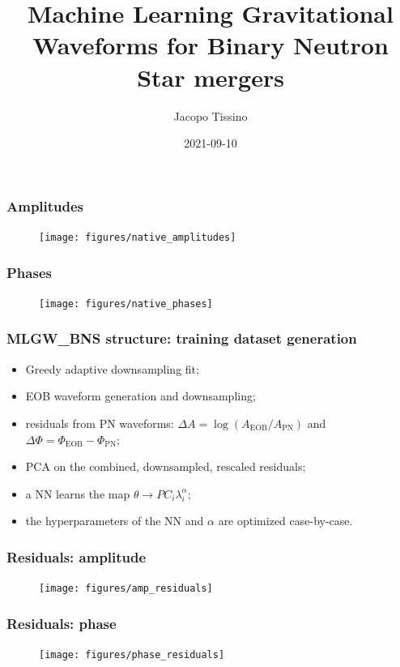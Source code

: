 \documentclass{beamer}
\title{Machine Learning Gravitational Waveforms for Binary Neutron Star mergers}
\author{Jacopo Tissino}
\date{2021-09-10}
\begin{document}
\frame{\titlepage}

\begin{frame}
    \frametitle{Amplitudes}
    \begin{figure}[ht]
    \centering
    \texttt{[image: figures/native\_amplitudes]}
    \label{fig:native_amplitudes}
    \end{figure}
\end{frame}

\begin{frame}
    \frametitle{Phases}
    \begin{figure}[ht]
    \centering
    \texttt{[image: figures/native\_phases]}
    \label{fig:native_phases}
    \end{figure}
\end{frame}

\begin{frame}
    \frametitle{MLGW\_BNS structure: training dataset generation}
    \begin{itemize}
    \item Greedy adaptive downsampling fit;
    \item EOB waveform generation and downsampling;
    \item residuals from PN waveforms: \(\Delta A = \log (A _{\text{EOB}}/ A _{\text{PN}})\) and \(\Delta \Phi = \Phi _{\text{EOB}} - \Phi _{\text{PN}}\);
    \item PCA on the combined, downsampled, rescaled residuals;
    \item a NN learns the map \(\theta \to PC_i \lambda_i^{\alpha}\);
    \item the hyperparameters of the NN and \(\alpha \) are optimized case-by-case.
    \end{itemize}
\end{frame}

\begin{frame}
    \frametitle{Residuals: amplitude}
    \begin{figure}[ht]
    \centering
    \texttt{[image: figures/amp\_residuals]}
    \label{fig:amp_residuals}
    \end{figure}
\end{frame}

\begin{frame}
    \frametitle{Residuals: phase}
    \begin{figure}[ht]
    \centering
    \texttt{[image: figures/phase\_residuals]}
    \label{fig:phase_residuals}
    \end{figure}
\end{frame}
\end{document}
